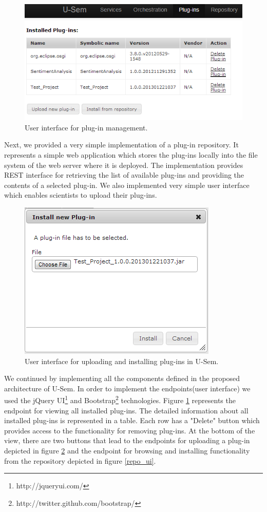 \begin{figure}[h!]
  \centering
  	\includegraphics[scale=0.70]{plug-in/ui/list.png}
  \caption{User interface for plug-in management.}
  \label{list_ui}
\end{figure}

Next, we provided a very simple implementation of a plug-in repository. It represents a simple web application which stores the plug-ins locally into the file system of the web server where it is deployed. The implementation provides REST interface for retrieving the list of available plug-ins and providing the contents of a selected plug-in. We also implemented very simple user interface which enables scientists to upload their plug-ins. 


\begin{figure}[h!]
  \centering
  	\includegraphics[scale=0.6]{plug-in/ui/upload.png}
  \caption{User interface for uploading and installing plug-ins in U-Sem.}
  \label{upload_ui}
\end{figure}

We continued by implementing all the components defined in the proposed architecture of U-Sem. In order to implement the endpoints(user interface) we used the jQuery UI\footnote{http://jqueryui.com/} and Bootstrap\footnote{http://twitter.github.com/bootstrap/} technologies. Figure \ref{list_ui} represents the endpoint for viewing all installed plug-ins. The detailed information about all installed plug-ins is represented in a table. Each row has a "Delete" button which provides access to the functionality for removing plug-ins. At the bottom of the view, there are two buttons that lead to the endpoints for uploading a plug-in depicted in figure \ref{upload_ui} and the endpoint for browsing and installing functionality from the repository depicted in figure \ref{repo_ui}.

